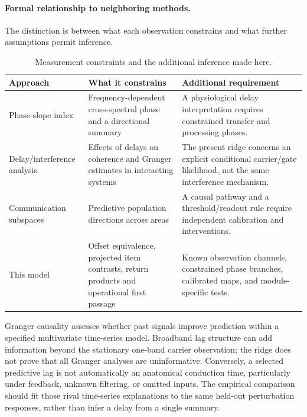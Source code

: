 \paragraph{Formal relationship to neighboring methods.} The distinction is between what each observation constrains and what further assumptions permit inference.
\begin{table}[htbp]\centering\small
\caption{Measurement constraints and the additional inference made here.}\label{tab:formal-comparison}
\begin{tabularx}{\linewidth}{@{}p{.24\linewidth}YY@{}}\toprule
Approach & What it constrains & Additional requirement\\\midrule
Phase-slope index \citep{nolte2008} & Frequency-dependent cross-spectral phase and a directional summary & A physiological delay interpretation requires constrained transfer and processing phases.\\\addlinespace
Delay/interference analysis \citep{dowdall2023} & Effects of delays on coherence and Granger estimates in interacting systems & The present ridge concerns an explicit conditional carrier/gate likelihood, not the same interference mechanism.\\\addlinespace
Communication subspaces \citep{semedo2019} & Predictive population directions across areas & A causal pathway and a threshold/readout rule require independent calibration and interventions.\\\addlinespace
This model & Offset equivalence, projected item contrasts, return products and operational first passage & Known observation channels, constrained phase branches, calibrated maps, and module-specific tests.\\\bottomrule
\end{tabularx}\end{table}
Granger causality assesses whether past signals improve prediction within a specified multivariate time-series model. Broadband lag structure can add information beyond the stationary one-band carrier observation; the ridge does not prove that all Granger analyses are uninformative. Conversely, a selected predictive lag is not automatically an anatomical conduction time, particularly under feedback, unknown filtering, or omitted inputs. The empirical comparison should fit those rival time-series explanations to the same held-out perturbation responses, rather than infer a delay from a single summary.
